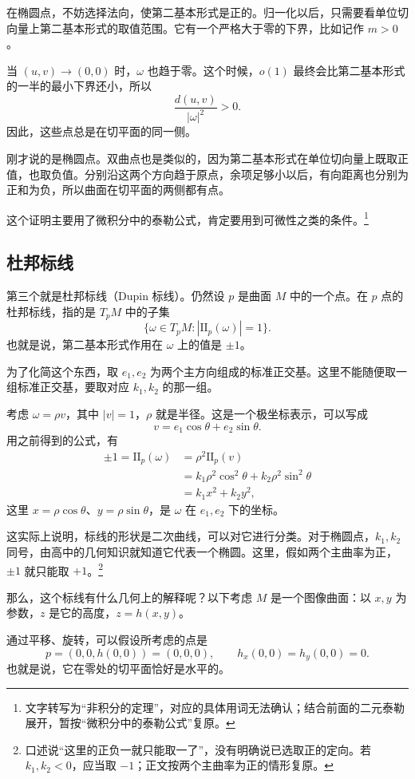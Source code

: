 \documentclass[UTF8,11pt,a4paper]{ctexart}
\newcommand{\II}{\mathrm{II}}
\begin{document}
在椭圆点，不妨选择法向，使第二基本形式是正的。归一化以后，只需要看单位切向量上第二基本形式的取值范围。它有一个严格大于零的下界，比如记作 $m>0$。

当 $(u,v)\to(0,0)$ 时，$\omega$ 也趋于零。这个时候，$o(1)$ 最终会比第二基本形式的一半的最小下界还小，所以
\[
\frac{d(u,v)}{|\omega|^2}>0.
\]
因此，这些点总是在切平面的同一侧。

刚才说的是椭圆点。双曲点也是类似的，因为第二基本形式在单位切向量上既取正值，也取负值。分别沿这两个方向趋于原点，余项足够小以后，有向距离也分别为正和为负，所以曲面在切平面的两侧都有点。

这个证明主要用了微积分中的泰勒公式，肯定要用到可微性之类的条件。\footnote{文字转写为“非积分的定理”，对应的具体用词无法确认；结合前面的二元泰勒展开，暂按“微积分中的泰勒公式”复原。}

\subsection{杜邦标线}

第三个就是杜邦标线（Dupin 标线）。仍然设 $p$ 是曲面 $M$ 中的一个点。在 $p$ 点的杜邦标线，指的是 $T_pM$ 中的子集
\[
\{\omega\in T_pM:|\II_p(\omega)|=1\}.
\]
也就是说，第二基本形式作用在 $\omega$ 上的值是 $\pm1$。

为了化简这个东西，取 $e_1,e_2$ 为两个主方向组成的标准正交基。这里不能随便取一组标准正交基，要取对应 $k_1,k_2$ 的那一组。

考虑 $\omega=\rho v$，其中 $|v|=1$，$\rho$ 就是半径。这是一个极坐标表示，可以写成
\[
v=e_1\cos\theta+e_2\sin\theta.
\]
用之前得到的公式，有
\[
\begin{aligned}
\pm1=\II_p(\omega)
&=\rho^2\II_p(v)\\
&=k_1\rho^2\cos^2\theta+k_2\rho^2\sin^2\theta\\
&=k_1x^2+k_2y^2,
\end{aligned}
\]
这里 $x=\rho\cos\theta$、$y=\rho\sin\theta$，是 $\omega$ 在 $e_1,e_2$ 下的坐标。

这实际上说明，标线的形状是二次曲线，可以对它进行分类。对于椭圆点，$k_1,k_2$ 同号，由高中的几何知识就知道它代表一个椭圆。这里，假如两个主曲率为正，$\pm1$ 就只能取 $+1$。\footnote{口述说“这里的正负一就只能取一了”，没有明确说已选取正的定向。若 $k_1,k_2<0$，应当取 $-1$；正文按两个主曲率为正的情形复原。}

那么，这个标线有什么几何上的解释呢？以下考虑 $M$ 是一个图像曲面：以 $x,y$ 为参数，$z$ 是它的高度，$z=h(x,y)$。

通过平移、旋转，可以假设所考虑的点是
\[
p=(0,0,h(0,0))=(0,0,0),\qquad h_x(0,0)=h_y(0,0)=0.
\]
也就是说，它在零处的切平面恰好是水平的。
\end{document}
